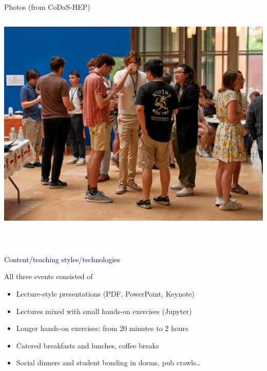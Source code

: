 \documentclass[aspectratio=169]{beamer}
\begin{document}
\begin{frame}{Photos (from CoDaS-HEP)}
\begin{columns}
\includegraphics[width=\linewidth]{PHOTOS/DSCF2642.jpg}
\end{columns}
\end{frame}

\begin{frame}{\mbox{ }}
\LARGE
\begin{center}
\textcolor{darkblue}{Content/teaching styles/technologies}
\end{center}
\end{frame}

\begin{frame}{All three events consisted of}
\Large
\vspace{0.5 cm}
\begin{itemize}\setlength{\itemsep}{0.25 cm}
\item<1-> Lecture-style presentations (PDF, PowerPoint, Keynote)
\item<2-> Lectures mixed with small hands-on exercises (Jupyter)
\item<3-> Longer hands-on exercises: from 20 minutes to 2 hours
\item<4-> Catered breakfasts and lunches, coffee breaks
\item<5-> Social dinners and student bonding in dorms, pub crawls\ldots
\end{itemize}

\vspace{0.5 cm}
\large
{}

\vspace{0.25 cm}
\end{frame}
\end{document}

